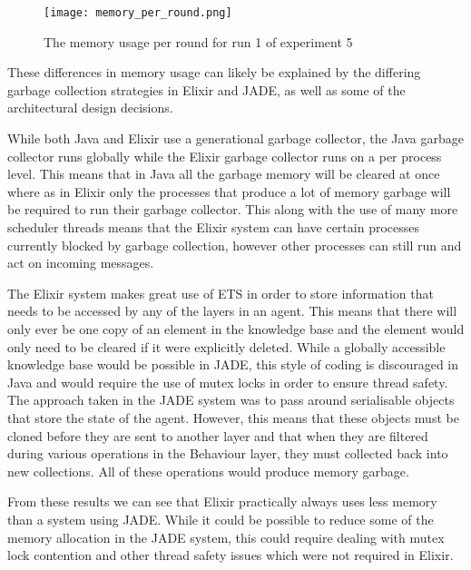 \begin{figure}[ht]
    \centering
    \texttt{[image: memory\_per\_round.png]}
    \caption{The memory usage per round for run 1 of experiment 5}\label{fig:memory_per_round}
\end{figure}

These differences in memory usage can likely be explained by the differing garbage collection strategies in Elixir and JADE, as well as some of the architectural design decisions.

While both Java and Elixir use a generational garbage collector, the Java garbage collector runs globally while the Elixir garbage collector runs on a per process level.
This means that in Java all the garbage memory will be cleared at once where as in Elixir only the processes that produce a lot of memory garbage will be required to run their garbage collector.
This along with the use of many more scheduler threads means that the Elixir system can have certain processes currently blocked by garbage collection, however other processes can still run and act on incoming messages.

The Elixir system makes great use of ETS in order to store information that needs to be accessed by any of the layers in an agent.
This means that there will only ever be one copy of an element in the knowledge base and the element would only need to be cleared if it were explicitly deleted.
While a globally accessible knowledge base would be possible in JADE, this style of coding is discouraged in Java and would require the use of mutex locks in order to ensure thread safety.
The approach taken in the JADE system was to pass around serialisable objects that store the state of the agent.
However, this means that these objects must be cloned before they are sent to another layer and that when they are filtered during various operations in the Behaviour layer, they must collected back into new collections.
All of these operations would produce memory garbage.

From these results we can see that Elixir practically always uses less memory than a system using JADE\@.
While it could be possible to reduce some of the memory allocation in the JADE system, this could require dealing with mutex lock contention and other thread safety issues which were not required in Elixir.
